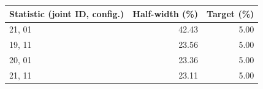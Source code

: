\begin{tabular}{lrr}
\toprule
Statistic (joint ID, config.) & Half-width (\%) & Target (\%) \\
\midrule
21, 01 & 42.43 & 5.00 \\
19, 11 & 23.56 & 5.00 \\
20, 01 & 23.36 & 5.00 \\
21, 11 & 23.11 & 5.00 \\
\bottomrule
\end{tabular}
